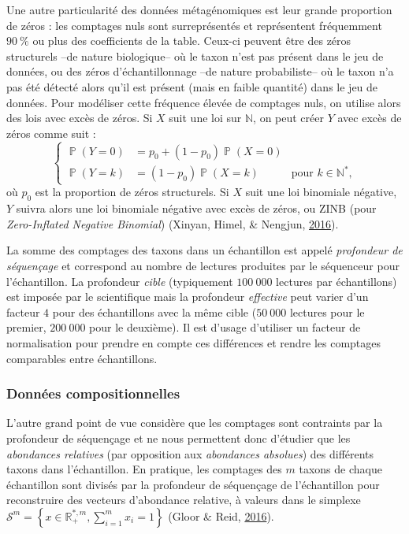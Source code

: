 \documentclass[12pt,a4paper]{reedthesis}
\newcommand \NN {\mathbb{N}}
\newcommand \RR {\mathbb{R}}
\DeclareMathOperator*{\prob}{\mathbb{P}}
\newcommand \PP [1]{\prob\left({#1}\right)}
\theoremstyle{definition}
\theoremstyle{definition}
\theoremstyle{definition}
\theoremstyle{remark}
\begin{document}
Une autre particularité des données métagénomiques est leur grande proportion de zéros : les comptages nuls sont surreprésentés et représentent fréquemment \(90~\%\) ou plus des coefficients de la table. Ceux-ci peuvent être des zéros structurels --de nature biologique-- où le taxon n'est pas présent dans le jeu de données, ou des zéros d'échantillonnage --de nature probabiliste-- où le taxon n'a pas été détecté alors qu'il est présent (mais en faible quantité) dans le jeu de données. Pour modéliser cette fréquence élevée de comptages nuls, on utilise alors des lois avec excès de zéros. Si \(X\) suit une loi sur \(\NN\), on peut créer \(Y\) avec excès de zéros comme suit :
\begin{equation*}
\left\{
\begin{aligned}
\PP{Y = 0} & = p_0 + (1-p_0) \PP{X = 0}\\
\PP{Y = k} & = (1-p_0) \PP{X = k} & \text{pour } k\in \NN^*,
\end{aligned}
\right.
\end{equation*}
où \(p_0\) est la proportion de zéros structurels. Si \(X\) suit une loi binomiale négative, \(Y\) suivra alors une loi binomiale négative avec excès de zéros, ou ZINB (pour \emph{Zero-Inflated Negative Binomial}) (Xinyan, Himel, \& Nengjun, \protect\hyperlink{ref-xinyan2016zero}{2016}).

La somme des comptages des taxons dans un échantillon est appelé \emph{profondeur de séquençage} et correspond au nombre de lectures produites par le séquenceur pour l'échantillon. La profondeur \emph{cible} (typiquement \(100~000\) lectures par échantillons) est imposée par le scientifique mais la profondeur \emph{effective} peut varier d'un facteur \(4\) pour des échantillons avec la même cible (\(50~000\) lectures pour le premier, \(200~000\) pour le deuxième).
Il est d'usage d'utiliser un facteur de normalisation pour prendre en compte ces différences et rendre les comptages comparables entre échantillons.

\hypertarget{donnuxe9es-compositionnelles}{%
\subsubsection*{Données compositionnelles}\label{donnuxe9es-compositionnelles}}

L'autre grand point de vue considère que les comptages sont contraints par la profondeur de séquençage et ne nous permettent donc d'étudier que les \emph{abondances relatives} (par opposition aux \emph{abondances absolues}) des différents taxons dans l'échantillon. En pratique, les comptages des \(m\) taxons de chaque échantillon sont divisés par la profondeur de séquençage de l'échantillon pour reconstruire des vecteurs d'abondance relative, à valeurs dans le simplexe \(\mathcal{S}^m = \left\{x \in \RR_+^{*,m}, \sum_{i=1}^m x_i = 1 \right\}\) (Gloor \& Reid, \protect\hyperlink{ref-gloor2016compositional}{2016}).
\end{document}
